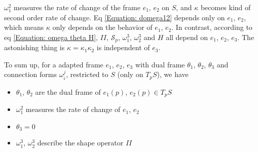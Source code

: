 \documentclass[10pt]{article}
\begin{document}
            \begin{remark}
                $\omega_1^2$ measures the rate of change of the frame $e_1$, $e_2$ on $S$, and $\kappa$ becomes kind of second order rate of change. Eq \eqref{Equation: domega12} depends only on $e_1$, $e_2$, which means $\kappa$ only depends on the behavior of $e_1$, $e_2$. In contrast, according to eq \eqref{Equation: omega theta H}, $II$, $\mathcal{S}_p$, $\omega_1^3$, $\omega_2^3$ and $H$ all depend on $e_1$, $e_2$, $e_3$. The astonishing thing is $\kappa=\kappa_1\kappa_2$ is independent of $e_3$.

                To sum up, for a adapted frame $e_1$, $e_2$, $e_3$ with dual frame $\theta_1$, $\theta_2$, $\theta_3$ and connection forms $\omega_i^j$, restricted to $S$ (only on $T_pS$), we have
                \begin{itemize}
                    \item $\theta_1$, $\theta_2$ are the dual frame of $e_1(p)$, $e_2(p)\in T_pS$
                    \vspace{-0.15cm}
                    \item $\omega_1^2$ measures the rate of change of $e_1$, $e_2$
                    \vspace{-0.15cm}
                    \item $\theta_3 = 0$
                    \vspace{-0.15cm}
                    \item $\omega_1^3$, $\omega_2^3$ describe the shape operator $II$
                \end{itemize}
            \end{remark}
\end{document}
